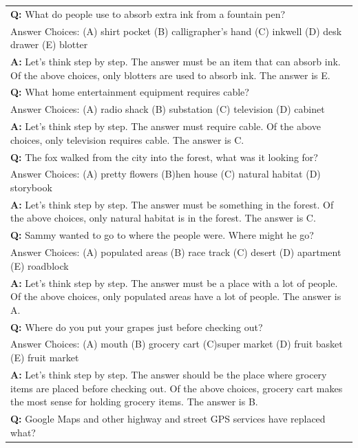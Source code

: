 \documentclass[11pt]{article}
\begin{document}
\begin{table}[ht]
    \centering
    \begin{tabularx}{\textwidth}{X}
    \toprule 
    \textbf{Q: }What do people use to absorb extra ink from a fountain pen? \\
    Answer Choices: (A) shirt pocket (B) calligrapher’s hand (C) inkwell (D) desk drawer (E) blotter \\
    \textbf{A: } Let's think step by step. The answer must be an item that can absorb ink. Of the above choices, only blotters are used to absorb ink. The answer is E. \\
    \hdashline 
    \textbf{Q: }What home entertainment equipment requires cable? \\
    Answer Choices: (A) radio shack (B) substation (C) television (D) cabinet \\
    \textbf{A: } Let's think step by step. The answer must require cable. Of the above choices, only television requires cable. The answer is C.\\
    \hdashline
    \textbf{Q: }The fox walked from the city into the forest, what was it looking for? \\
    Answer Choices: (A) pretty flowers (B)hen house (C) natural habitat (D) storybook \\
    \textbf{A: }Let's think step by step. The answer must be something in the forest. Of the above choices, only natural habitat is in the forest. The answer is C.\\
    \hdashline
    \textbf{Q: }Sammy wanted to go to where the people were. Where might he go? \\
    Answer Choices: (A) populated areas (B) race track (C) desert (D) apartment (E) roadblock \\
    \textbf{A: }Let's think step by step. The answer must be a place with a lot of people. Of the above choices, only populated areas have a lot of people. The answer is A.\\
    \hdashline
    \textbf{Q: }Where do you put your grapes just before checking out? \\
    Answer Choices: (A) mouth (B) grocery cart (C)super market (D) fruit basket (E) fruit market \\
    \textbf{A: }Let's think step by step. The answer should be the place where grocery items are placed before checking out. Of the above choices, grocery cart makes the most sense for holding grocery items. The answer is B.\\
    \hdashline
    \textbf{Q: }Google Maps and other highway and street GPS services have replaced what? \\

\end{tabularx}
\end{table}
\end{document}
